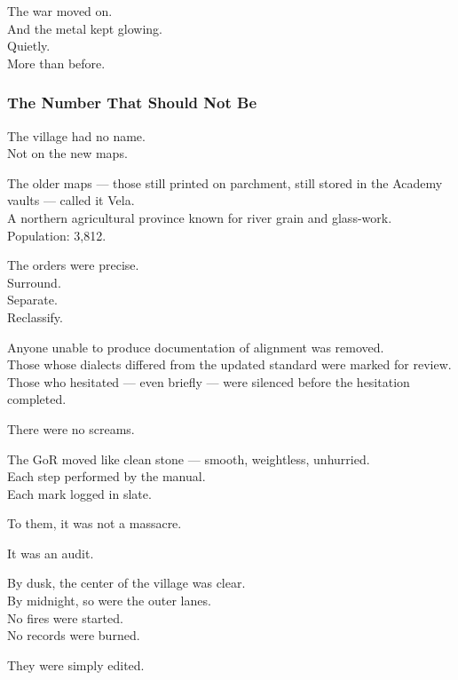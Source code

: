 \documentclass[12pt]{article}
\begin{document}
The war moved on.\\
And the metal kept glowing.\\
Quietly.\\
More than before.

\dotfill

\subsubsection*{The Number That Should Not Be}

The village had no name.\\
Not on the new maps.

The older maps — those still printed on parchment, still stored in the Academy vaults — called it Vela.\\
A northern agricultural province known for river grain and glass-work.\\
Population: 3,812.

\vspace{1em}

The orders were precise.\\
Surround.\\
Separate.\\
Reclassify.

Anyone unable to produce documentation of alignment was removed.\\
Those whose dialects differed from the updated standard were marked for review.\\
Those who hesitated — even briefly — were silenced before the hesitation completed.

\vspace{1em}

There were no screams.

The GoR moved like clean stone — smooth, weightless, unhurried.\\
Each step performed by the manual.\\
Each mark logged in slate.

To them, it was not a massacre.

It was an audit.

\vspace{1em}

By dusk, the center of the village was clear.\\
By midnight, so were the outer lanes.\\
No fires were started.\\
No records were burned.

They were simply edited.
\end{document}
